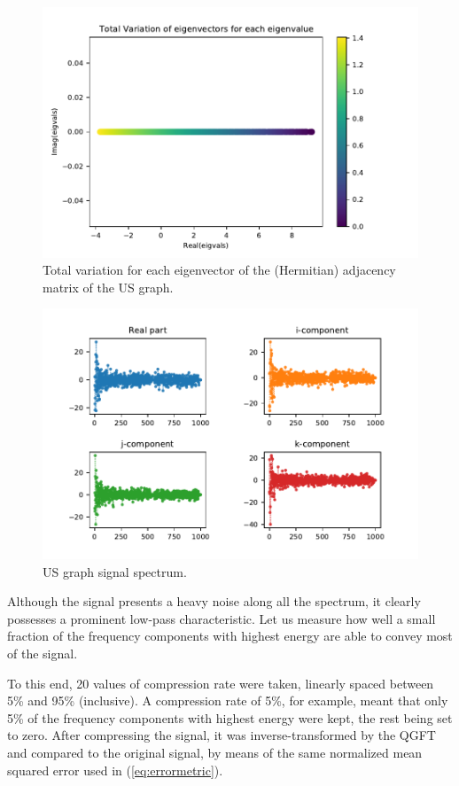 \renewcommand{\floatpagefraction}{.8}%
\begin{figure}
    \centering
    \includegraphics[width=0.65\linewidth]{Figures/usa_example/us_counties_qgsp_tv1.pdf}
    \caption{Total variation for each eigenvector of the (Hermitian) adjacency matrix of the US graph.}
    \label{fig:us_counties_qgsp_tv1}
\end{figure}

\begin{figure}
    \centering
    \includegraphics[width=0.95\linewidth]{Figures/usa_example/us_counties_qgsp_spectrumsig.pdf}
    \caption{US graph signal spectrum.}
    \label{fig:us_counties_qgsp_spectrumsig}
\end{figure}

Although the signal presents a heavy noise along all the spectrum, it clearly possesses a prominent low-pass characteristic. Let us measure how well a small fraction of the frequency components with highest energy are able to convey most of the signal.

To this end, 20 values of compression rate were taken, linearly spaced between 5\% and 95\% (inclusive). A compression rate of 5\%, for example, meant that only 5\% of the frequency components with highest energy were kept, the rest being set to zero. After compressing the signal, it was inverse-transformed by the QGFT and compared to the original signal, by means of the same normalized mean squared error used in (\ref{eq:errormetric}).

